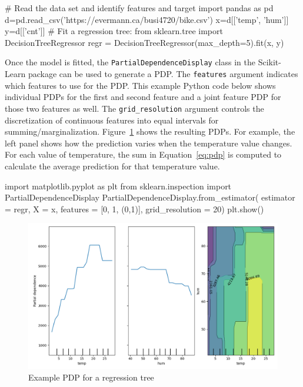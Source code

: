 \begin{samepage}
\begin{pythoncode}
# Read the data set and identify features and target
import pandas as pd
d=pd.read_csv('https://evermann.ca/busi4720/bike.csv')
x=d[['temp', 'hum']]
y=d[['cnt']]
# Fit a regression tree:
from sklearn.tree import DecisionTreeRegressor
regr = DecisionTreeRegressor(max_depth=5).fit(x, y)
\end{pythoncode}
\end{samepage}

Once the model is fitted, the \texttt{PartialDependenceDisplay} class in the Scikit-Learn package can be used to generate a PDP. The \texttt{features} argument indicates which features to use for the PDP. This example Python code below shows individual PDPs for the first and second feature and a joint feature PDP for those two features as well. The \texttt{grid\_resolution} argument controls the discretization of continuous features into equal intervals for summing/marginalization. Figure~\ref{fig:pdp} shows the resulting PDPs. For example, the left panel shows how the prediction varies when the temperature value changes. For each value of temperature, the sum in Equation~\ref{eq:pdp} is computed to calculate the average prediction for that temperature value.

\begin{samepage}
\begin{pythoncode}
import matplotlib.pyplot as plt
from sklearn.inspection import PartialDependenceDisplay
PartialDependenceDisplay.from_estimator(
    estimator = regr, 
    X = x, features = [0, 1, (0,1)], grid_resolution = 20)
plt.show()
\end{pythoncode}
\end{samepage}

\begin{figure}
\centering
\includegraphics[width=.75\textwidth]{pdp_dtr.png}
\caption{Example PDP for a regression tree}
\label{fig:pdp}
\end{figure}

